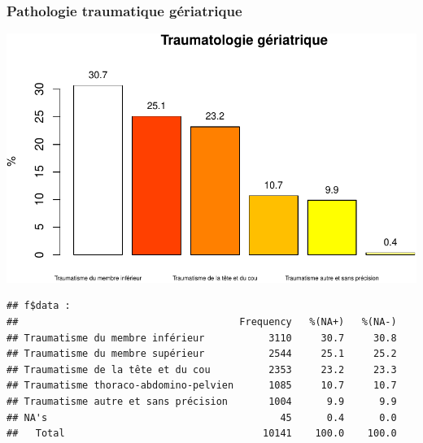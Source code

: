 \documentclass[]{article}
\newenvironment{Shaded}{\begin{snugshade}}{\end{snugshade}}
\newcommand{\KeywordTok}[1]{\textcolor[rgb]{0.13,0.29,0.53}{\textbf{{#1}}}}
\newcommand{\DataTypeTok}[1]{\textcolor[rgb]{0.13,0.29,0.53}{{#1}}}
\newcommand{\FloatTok}[1]{\textcolor[rgb]{0.00,0.00,0.81}{{#1}}}
\newcommand{\StringTok}[1]{\textcolor[rgb]{0.31,0.60,0.02}{{#1}}}
\newcommand{\NormalTok}[1]{{#1}}
\begin{document}
\subsubsection{Pathologie traumatique
gériatrique}\label{pathologie-traumatique-geriatrique}

\begin{Shaded}
\end{Shaded}

\includegraphics{analyse_merge_files/figure-latex/chap_ger_trau-1.pdf}\\

\begin{verbatim}
## f$data : 
##                                      Frequency   %(NA+)   %(NA-)
## Traumatisme du membre inférieur           3110     30.7     30.8
## Traumatisme du membre supérieur           2544     25.1     25.2
## Traumatisme de la tête et du cou          2353     23.2     23.3
## Traumatisme thoraco-abdomino-pelvien      1085     10.7     10.7
## Traumatisme autre et sans précision       1004      9.9      9.9
## NA's                                        45      0.4      0.0
##   Total                                  10141    100.0    100.0
\end{verbatim}
\end{document}
